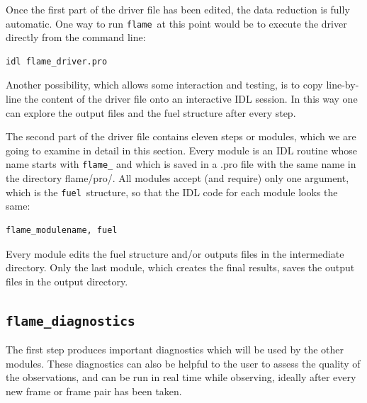 \documentclass[a4paper, notitlepage]{article}
\newcommand{\flame}{\texttt{flame}}
\newcommand{\fuel}{\texttt{fuel}}
\begin{document}
Once the first part of the driver file has been edited, the data reduction is fully automatic. One way to run \flame\ at this point would be to execute the driver directly from the command line:
\begin{lstlisting}
idl flame_driver.pro
\end{lstlisting}
Another possibility, which allows some interaction and testing, is to copy line-by-line the content of the driver file onto an interactive IDL session. In this way one can explore the output files and the fuel structure after every step.

The second part of the driver file contains eleven steps or modules, which we are going to examine in detail in this section. Every module is an IDL routine whose name starts with \texttt{flame\_} and which is saved in a .pro file with the same name in the directory flame/pro/. All modules accept (and require) only one argument, which is the \fuel\ structure, so that the IDL code for each module looks the same:
\begin{lstlisting}
flame_modulename, fuel
\end{lstlisting}

Every module edits the fuel structure and/or outputs files in the intermediate directory. Only the last module, which creates the final results, saves the output files in the output directory.



\subsection{\texttt{flame\_diagnostics}}
\label{sec:diagnostics}

The first step produces important diagnostics which will be used by the other modules. These diagnostics can also be helpful to the user to assess the quality of the observations, and can be run in real time while observing, ideally after every new frame or frame pair has been taken.
\end{document}
